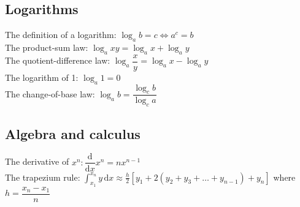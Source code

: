 \documentclass[class=exam, crop=false, 12pt]{standalone}
\begin{document}
\subsection*{Logarithms}
The definition of a logarithm: $\log_{a}{b} = c \Leftrightarrow a^{c} = b$\vspace{0.1in}\\
The product-sum law: $\log_{a}{xy} = \log_{a}{x}+\log_{a}{y}$\vspace{0.1in}\\
The quotient-difference law: $\log_{a}{\dfrac{x}{y}} = \log_{a}{x} - \log_{a}{y}$\vspace{0.1in}\\
The logarithm of 1: $\log_{a}{1} = 0$ \vspace{0.1in}\\
The change-of-base law: $\log_{a}{b} = \dfrac{\log_{c}{b}}{\log_{c}{a}}$


\subsection*{Algebra and calculus}
The derivative of $x^{n} : \dfrac{\text{d}}{\text{d}x} x^{n} = nx^{n-1}$\vspace{0.1in}\\
The trapezium rule: $\int_{x_{1}}^{x_{n}}y \, \text{d}x \approx \frac{h}{2} \left[ y_{1} + 2(y_{2}+y_{3} + \dots + y_{n-1}) + y_{n} \right]$ where $h = 
\dfrac{x_{n} - x_{1}}{n}$
\end{document}

